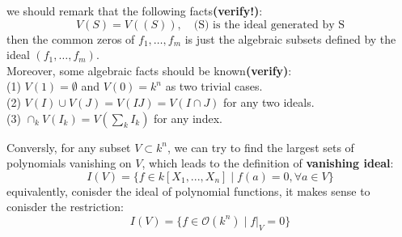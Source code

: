 \begin{remark} \label{varietymakestop}
    we should remark that the following facts\textbf{(verify!)}: \\
\[V(S) = V((S)), \quad \text{(S) is the ideal generated by S}\]
then the common zeros of \(f_1,\dots,f_m\) is just the algebraic subsets defined by the ideal \((f_1,\dots,f_m)\).\\

Moreover, some algebraic facts should be known\textbf{(verify)}:\\

(1) \(V(1) = \emptyset\) and \(V(0) = k^n\) as two trivial cases.\\

(2) \(V(I)\cup V(J) = V(IJ) = V(I \cap J)\) for any two ideals.\\

(3) \(\cap_{k}V(I_k) = V(\sum_k I_k)\) for any index.
\end{remark}


Conversly, for any subset \(V \subset k^n\), we can try to find the largest sets of polynomials vanishing on \(V\), which leads to the definition of \textbf{vanishing ideal}:
\[I(V) = \{f \in k[X_1,...,X_n] \mid f(a) = 0,  \forall a \in V\}\]
equivalently, conisder the ideal of polynomial functions, it makes sense to conisder the restriction:
\[I(V) = \{f \in \mathcal{O}(k^n) \mid f|_V = 0\}\]


